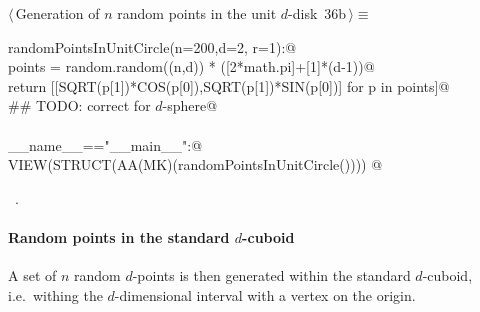 \documentclass[11pt,oneside]{article}	%
\begin{document}
\begin{flushleft} \small \label{scrap46}
\protect{}$\langle\,$Generation of $n$ random points in the unit $d$-disk\nobreak\ {\footnotesize 36b}$\,\rangle\equiv$
\vspace{-1ex}
\begin{list}{}{} \item
\mbox{}\verb@def randomPointsInUnitCircle(n=200,d=2, r=1):@\\
\mbox{}\verb@   points = random.random((n,d)) * ([2*math.pi]+[1]*(d-1))@\\
\mbox{}\verb@   return [[SQRT(p[1])*COS(p[0]),SQRT(p[1])*SIN(p[0])] for p in points]@\\
\mbox{}\verb@   ## TODO: correct for $d$-sphere@\\
\mbox{}\verb@@\\
\mbox{}\verb@if __name__=="__main__":@\\
\mbox{}\verb@   VIEW(STRUCT(AA(MK)(randomPointsInUnitCircle()))) @\\
\mbox{}\verb@@{\NWsep}
\end{list}
\vspace{-1ex}
\footnotesize\addtolength{\baselineskip}{-1ex}
\begin{list}{}{\setlength{\itemsep}{-\parsep}\setlength{\itemindent}{-\leftmargin}}
\item \NWtxtMacroRefIn\ .
\end{list}
\end{flushleft}

\paragraph{Random points in the standard $d$-cuboid} 
A set of $n$ random $d$-points is then generated within the standard $d$-cuboid, i.e.~withing the $d$-dimensional interval with a vertex on the origin.
\end{document}
